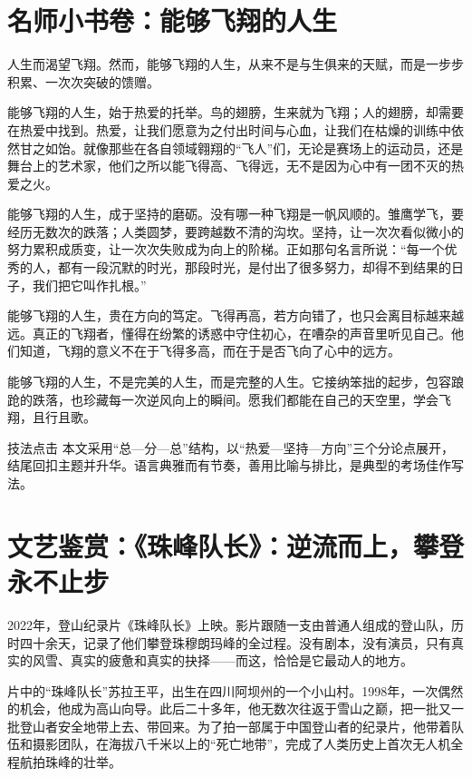\clearpage
\section*{名师小书卷：能够飞翔的人生}

人生而渴望飞翔。然而，能够飞翔的人生，从来不是与生俱来的天赋，而是一步步积累、一次次突破的馈赠。

能够飞翔的人生，始于热爱的托举。鸟的翅膀，生来就为飞翔；人的翅膀，却需要在热爱中找到。热爱，让我们愿意为之付出时间与心血，让我们在枯燥的训练中依然甘之如饴。就像那些在各自领域翱翔的“飞人”们，无论是赛场上的运动员，还是舞台上的艺术家，他们之所以能飞得高、飞得远，无不是因为心中有一团不灭的热爱之火。

能够飞翔的人生，成于坚持的磨砺。没有哪一种飞翔是一帆风顺的。雏鹰学飞，要经历无数次的跌落；人类圆梦，要跨越数不清的沟坎。坚持，让一次次看似微小的努力累积成质变，让一次次失败成为向上的阶梯。正如那句名言所说：“每一个优秀的人，都有一段沉默的时光，那段时光，是付出了很多努力，却得不到结果的日子，我们把它叫作扎根。”

能够飞翔的人生，贵在方向的笃定。飞得再高，若方向错了，也只会离目标越来越远。真正的飞翔者，懂得在纷繁的诱惑中守住初心，在嘈杂的声音里听见自己。他们知道，飞翔的意义不在于飞得多高，而在于是否飞向了心中的远方。

能够飞翔的人生，不是完美的人生，而是完整的人生。它接纳笨拙的起步，包容踉跄的跌落，也珍藏每一次逆风向上的瞬间。愿我们都能在自己的天空里，学会飞翔，且行且歌。

\begin{quoteBox}{技法点击}
本文采用“总—分—总”结构，以“热爱—坚持—方向”三个分论点展开，结尾回扣主题并升华。语言典雅而有节奏，善用比喻与排比，是典型的考场佳作写法。
\end{quoteBox}

\clearpage
\section*{文艺鉴赏：《珠峰队长》：逆流而上，攀登永不止步}

2022年，登山纪录片《珠峰队长》上映。影片跟随一支由普通人组成的登山队，历时四十余天，记录了他们攀登珠穆朗玛峰的全过程。没有剧本，没有演员，只有真实的风雪、真实的疲惫和真实的抉择——而这，恰恰是它最动人的地方。

片中的“珠峰队长”苏拉王平，出生在四川阿坝州的一个小山村。1998年，一次偶然的机会，他成为高山向导。此后二十多年，他无数次往返于雪山之巅，把一批又一批登山者安全地带上去、带回来。为了拍一部属于中国登山者的纪录片，他带着队伍和摄影团队，在海拔八千米以上的“死亡地带”，完成了人类历史上首次无人机全程航拍珠峰的壮举。

